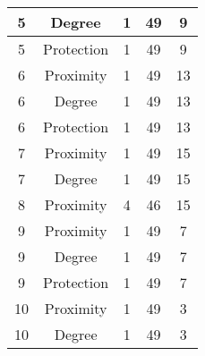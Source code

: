 \documentclass[results.tex]{subfiles}
\begin{document}
\begin{center}
\begin{tabular}{| c || c | c | c | c |}
            \hline
            5                       & Degree                       & 1                      & 49                      & 9                    \\
            \hline
            5                       & Protection                   & 1                      & 49                      & 9                    \\
            \hline
            6                       & Proximity                    & 1                      & 49                      & 13                   \\
            \hline
            6                       & Degree                       & 1                      & 49                      & 13                   \\
            \hline
            6                       & Protection                   & 1                      & 49                      & 13                   \\
            \hline
            7                       & Proximity                    & 1                      & 49                      & 15                   \\
            \hline
            7                       & Degree                       & 1                      & 49                      & 15                   \\
            \hline
            8                       & Proximity                    & 4                      & 46                      & 15                   \\
            \hline
            9                       & Proximity                    & 1                      & 49                      & 7                    \\
            \hline
            9                       & Degree                       & 1                      & 49                      & 7                    \\
            \hline
            9                       & Protection                   & 1                      & 49                      & 7                    \\
            \hline
            10                      & Proximity                    & 1                      & 49                      & 3                    \\
            \hline
            10                      & Degree                       & 1                      & 49                      & 3                    \\

\end{tabular}
\end{center}
\end{document}

